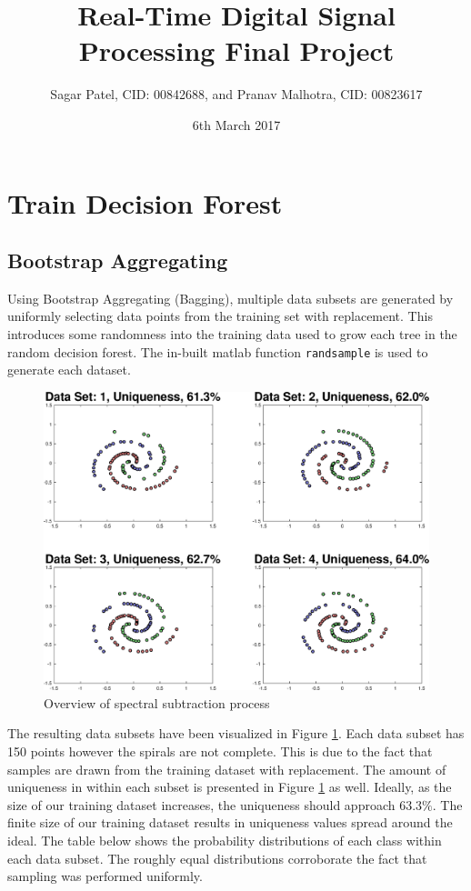 \documentclass[a4paper,pra,twocolumn,10pt,aps,longbibliography,nobalancelastpage]{revtex4-1}
\begin{document}
\title{Real-Time Digital Signal Processing Final Project}
\author{Sagar Patel, CID: 00842688, and Pranav Malhotra, CID: 00823617}
\date{6th March 2017}

\maketitle
\section{Train Decision Forest}

\subsection{Bootstrap Aggregating}
Using Bootstrap Aggregating (Bagging), multiple data subsets are generated by uniformly selecting data points from the training set with replacement. This introduces some randomness into the
training data used to grow each tree in the random decision forest. The in-built matlab function \texttt{randsample} is used to generate each dataset. 

\begin{figure}[H]
	\centering
    \includegraphics[width=0.60\columnwidth]{boot_strap}
    \caption{Overview of spectral subtraction process}
    \label{fig:boot_strap}
\end{figure}

The resulting data subsets have been visualized in Figure \ref{fig:boot_strap}. Each data subset has 150 points however the spirals are not complete. This is due to the fact that samples are drawn from the training dataset with replacement. The amount of uniqueness in within each subset is presented in Figure \ref{fig:boot_strap} as well.  Ideally, as the size of our training dataset increases, the uniqueness should approach $63.3\%$. The finite size of our training dataset results in uniqueness values spread around the ideal. The table below shows the probability distributions of each class within each data subset. The roughly equal distributions corroborate the fact that sampling was performed uniformly.
\end{document}
